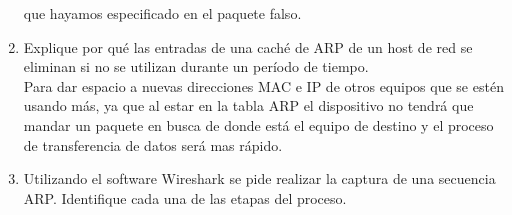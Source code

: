 \documentclass{udparticle}
\begin{document}
\begin{enumerate}
    que hayamos especificado en el paquete falso.\\
    \item Explique por qué las entradas de una caché de ARP de un host de red se eliminan si no se
    utilizan durante un período de tiempo.\\
    Para dar espacio a nuevas direcciones MAC e IP de otros equipos que se estén usando más, ya que al estar en la tabla ARP el
    dispositivo no tendrá que mandar un paquete en busca de donde está el equipo de destino y el proceso de transferencia de datos
    será mas rápido.\\
    \item Utilizando el software Wireshark se pide realizar la captura de una secuencia ARP. Identifique
    cada una de las etapas del proceso.\\
    

\end{enumerate}
\end{document}
